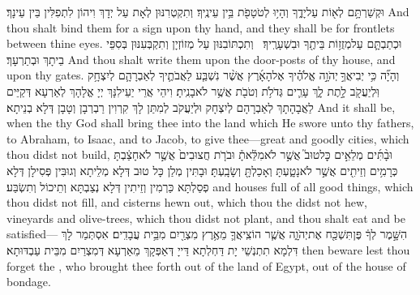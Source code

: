 {וּקְשַׁרְתָּ֥ם לְא֖וֹת עַל\maqqaf יָדֶ֑ךָ וְהָי֥וּ לְטֹטָפֹ֖ת בֵּ֥ין עֵינֶֽיךָ׃}
{וְתִקְטְרִנּוּן לְאָת עַל יְדָךְ וִיהוֹן לִתְפִלִּין בֵּין עֵינָךְ׃}
{And thou shalt bind them for a sign upon thy hand, and they shall be for frontlets between thine eyes.}{}
{וּכְתַבְתָּ֛ם עַל\maqqaf מְזֻז֥וֹת בֵּיתֶ֖ךָ וּבִשְׁעָרֶֽיךָ׃ \setuma }
{וְתִכְתּוֹבִנּוּן עַל מְזוֹזְיָן וְתִקְבְּעִנּוּן בְּסִפֵּי בֵיתָךְ וּבְתַרְעָךְ׃}
{And thou shalt write them upon the door-posts of thy house, and upon thy gates.}{}
{וְהָיָ֞ה כִּ֥י יְבִיאֲךָ֣ \legarmeh  יְהֹוָ֣ה אֱלֹהֶ֗יךָ אֶל\maqqaf הָאָ֜רֶץ אֲשֶׁ֨ר נִשְׁבַּ֧ע לַאֲבֹתֶ֛יךָ לְאַבְרָהָ֛ם לְיִצְחָ֥ק וּֽלְיַעֲקֹ֖ב לָ֣תֶת לָ֑ךְ עָרִ֛ים גְּדֹלֹ֥ת וְטֹבֹ֖ת אֲשֶׁ֥ר לֹא\maqqaf בָנִֽיתָ׃}
{וִיהֵי אֲרֵי יַעֵילִנָּךְ יְיָ אֱלָהָךְ לְאַרְעָא דְּקַיֵּים לַאֲבָהָתָךְ לְאַבְרָהָם לְיִצְחָק וּלְיַעֲקֹב לְמִתַּן לָךְ קִרְוִין רַבְרְבָן וְטָבָן דְּלָא בְנֵיתָא׃}
{And it shall be, when the \lord\space thy God shall bring thee into the land which He swore unto thy fathers, to Abraham, to Isaac, and to Jacob, to give thee—great and goodly cities, which thou didst not build,}{}
{וּבָ֨תִּ֜ים מְלֵאִ֣ים כׇּל\maqqaf טוּב֮ אֲשֶׁ֣ר לֹא\maqqaf מִלֵּ֒אתָ֒ וּבֹרֹ֤ת חֲצוּבִים֙ אֲשֶׁ֣ר לֹא\maqqaf חָצַ֔בְתָּ כְּרָמִ֥ים וְזֵיתִ֖ים אֲשֶׁ֣ר לֹא\maqqaf נָטָ֑עְתָּ וְאָכַלְתָּ֖ וְשָׂבָֽעְתָּ׃}
{וּבָתִּין מְלַן כָּל טוּב דְּלָא מְלֵיתָא וְגוּבִּין פְּסִילָן דְּלָא פְסַלְתָּא כַּרְמִין וְזֵיתִין דְּלָא נְצַבְתָּא וְתֵיכוֹל וְתִשְׂבַּע׃}
{and houses full of all good things, which thou didst not fill, and cisterns hewn out, which thou the didst not hew, vineyards and olive-trees, which thou didst not plant, and thou shalt eat and be satisfied—}{}
{הִשָּׁ֣מֶר לְךָ֔ פֶּן\maqqaf תִּשְׁכַּ֖ח אֶת\maqqaf יְהֹוָ֑ה אֲשֶׁ֧ר הוֹצִֽיאֲךָ֛ מֵאֶ֥רֶץ מִצְרַ֖יִם מִבֵּ֥ית עֲבָדִֽים׃}
{אִסְתְּמַר לָךְ דִּלְמָא תִתְנְשֵׁי יָת דַּחְלְתָא דַּייָ דְּאַפְּקָךְ מֵאַרְעָא דְּמִצְרַיִם מִבֵּית עַבְדּוּתָא׃}
{then beware lest thou forget the \lord, who brought thee forth out of the land of Egypt, out of the house of bondage.}{}
